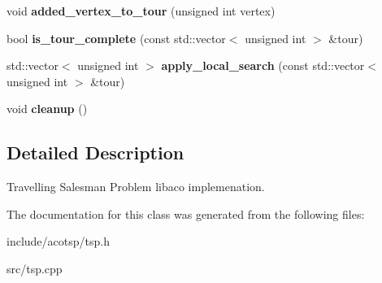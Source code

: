 \begin{CompactItemize}
\item 
\hypertarget{classTspProblem_f9595b6b5ccb2acc960c8d1d75943754}{
void \textbf{added\_\-vertex\_\-to\_\-tour} (unsigned int vertex)}
\label{classTspProblem_f9595b6b5ccb2acc960c8d1d75943754}

\item 
\hypertarget{classTspProblem_94034be2774ce543db140a841e09c83a}{
bool \textbf{is\_\-tour\_\-complete} (const std::vector$<$ unsigned int $>$ \&tour)}
\label{classTspProblem_94034be2774ce543db140a841e09c83a}

\item 
\hypertarget{classTspProblem_38ec0182d8032bfae748704aad67a26b}{
std::vector$<$ unsigned int $>$ \textbf{apply\_\-local\_\-search} (const std::vector$<$ unsigned int $>$ \&tour)}
\label{classTspProblem_38ec0182d8032bfae748704aad67a26b}

\item 
\hypertarget{classTspProblem_d3ad8f53bbeaa2e44dfa98209ce9edf1}{
void \textbf{cleanup} ()}
\label{classTspProblem_d3ad8f53bbeaa2e44dfa98209ce9edf1}

\end{CompactItemize}


\subsection{Detailed Description}
Travelling Salesman Problem libaco implemenation. 

The documentation for this class was generated from the following files:\begin{CompactItemize}
\item 
include/acotsp/tsp.h\item 
src/tsp.cpp\end{CompactItemize}
